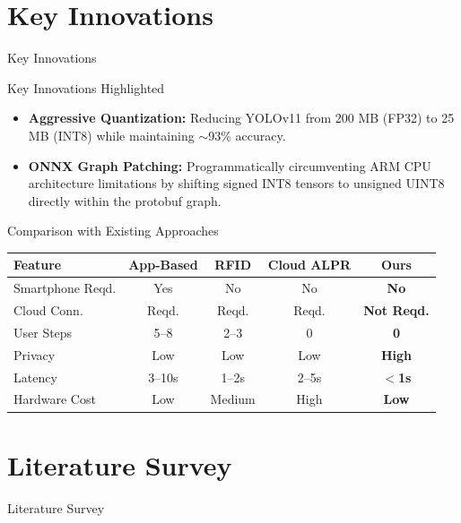 \documentclass{beamer}
\begin{document}
\section{Key Innovations}

\begin{frame}
    \centering
    \Huge Key Innovations
\end{frame}

\begin{frame}{Key Innovations Highlighted}
\begin{itemize}
    \item \textbf{Aggressive Quantization:} Reducing YOLOv11 from 200 MB (FP32) to 25 MB (INT8) while maintaining $\sim$93\% accuracy.
    \item \textbf{ONNX Graph Patching:} Programmatically circumventing ARM CPU architecture limitations by shifting signed INT8 tensors to unsigned UINT8 directly within the protobuf graph.
\end{itemize}
\end{frame}

\begin{frame}{Comparison with Existing Approaches}
\begin{table}[]
\centering
\renewcommand{\arraystretch}{1.3}
\footnotesize
\begin{tabular}{|l|c|c|c|c|}
\hline
\textbf{Feature} & \textbf{App-Based} & \textbf{RFID} & \textbf{Cloud ALPR} & \textbf{Ours} \\
\hline
Smartphone Reqd. & Yes & No & No & \textbf{No} \\
Cloud Conn.      & Reqd. & Reqd. & Reqd. & \textbf{Not Reqd.} \\
User Steps       & 5--8 & 2--3 & 0 & \textbf{0} \\
Privacy          & Low & Low & Low & \textbf{High} \\
Latency          & 3--10s & 1--2s & 2--5s & \textbf{$<$1s} \\
Hardware Cost    & Low & Medium & High & \textbf{Low} \\
\hline
\end{tabular}
\end{table}
\end{frame}

\section{Literature Survey}

\begin{frame}
    \centering
    \Huge Literature Survey
\end{frame}
\end{document}
